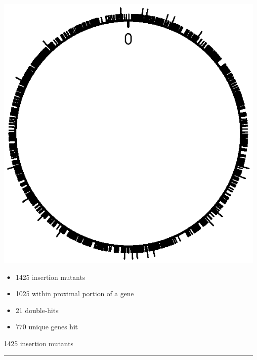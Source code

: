 \documentclass[12pt]{article}
\newcommand{\headsize}{\fontsize{35}{35} \selectfont}
\newcommand{\textsize}{\fontsize{30}{35} \selectfont}
\newcommand{\headcolor}{\color [cmyk]{0.72,0.67,0.33,0}}
\newcommand{\linecolor}{\color [named]{Thistle}}
\begin{document}
\begin{minipage}[t]{4in}
\vspace*{-30mm}
\centerline{\includegraphics[]{Figs/circlefig.ps}}
\end{minipage}
\hfill
\begin{minipage}[t]{5in} \begin{itemize}
\vspace*{0mm}
\setlength{\rightskip}{0pt plus 1fil} %
\setlength{\itemsep}{15pt}

\item 1425 insertion mutants

\item 1025 within proximal portion of a gene

\item 21 double-hits

\item 770 unique genes hit


\end{itemize}
\end{minipage}


\newpage

\headsize \headcolor
\centerline{1425 insertion mutants}
\linecolor \noindent \rule[3mm]{10in}{2mm}

\vspace{5mm}
\normalcolor \textsize 
\end{document}

